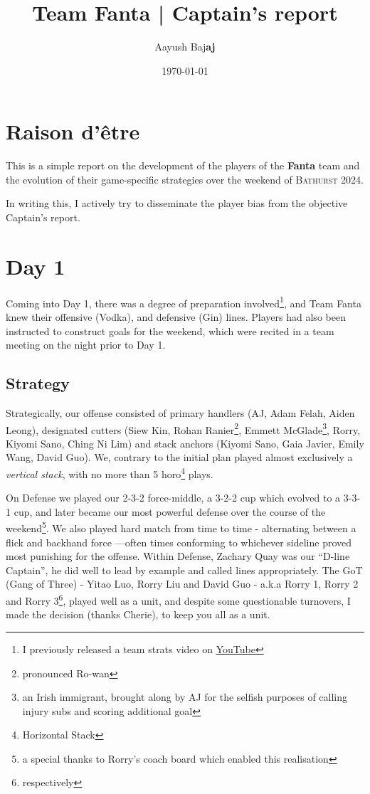 \documentclass[12pt]{article}
\author{Aayush Baj\textbf{aj}}
\date{\today}
\title{Team Fanta | Captain's report}
\newcommand{\aj}{A\hspace{-0.25em}\raisebox{-.35em}J}
\begin{document}
\maketitle
\dotfill
\tableofcontents
\dotfill

\newpage

\section{Raison d'\^{e}tre}
This is a simple report on the development of the players of the \textbf{Fanta} team and the evolution of their game-specific strategies over the weekend of \textsc{Bathurst 2024}.

In writing this, I actively try to disseminate the player bias from the objective Captain's report.

\section{Day 1}
Coming into Day 1, there was a degree of preparation involved\footnote{I previously released a team strats video on \href{https://youtu.be/SpE09h80q94}{YouTube}}, and Team Fanta knew their offensive (Vodka), and defensive (Gin) lines. Players had also been instructed to construct goals for the weekend, which were recited in a team meeting on the night prior to Day 1.

\subsection{Strategy}
Strategically, our offense consisted of primary handlers (\aj{}, Adam Felah, Aiden Leong), designated cutters (Siew Kin, Rohan Ranier\footnote{pronounced Ro-wan}, Emmett McGlade\footnote{an Irish immigrant, brought along by \aj{} for the selfish purposes of calling injury subs and scoring additional goal}, Rorry, Kiyomi Sano, Ching Ni Lim) and stack anchors (Kiyomi Sano, Gaia Javier, Emily Wang, David Guo). We, contrary to the initial plan played almost exclusively a \emph{vertical stack}, with no more than 5 horo\footnote{Horizontal Stack} plays.

On Defense we played our 2-3-2 force-middle, a 3-2-2 cup which evolved to a 3-3-1 cup, and later became our most powerful defense over the course of the weekend\footnote{a special thanks to Rorry's coach board which enabled this realisation}. We also played hard match from time to time - alternating between a flick and backhand force ---often times conforming to whichever sideline proved most punishing for the offense.
Within Defense, Zachary Quay was our \enquote{D-line Captain}, he did well to lead by example and called lines appropriately. The GoT (Gang of Three) - Yitao Luo, Rorry Liu and David Guo - a.k.a Rorry 1, Rorry 2 and Rorry 3\footnote{respectively}, played well as a unit, and despite some questionable turnovers, I made the decision (thanks Cherie), to keep you all as a unit.
\end{document}
